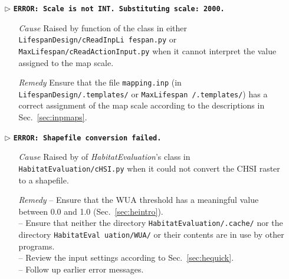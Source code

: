\begin{itemize}
	\item[$\triangleright$]\textbf{\texttt{ERROR: Scale is not INT. Substituting scale: 2000.}}
	\begin{itemize}
		\item[\textit{Cause}\hspace{0.27cm}] Raised by  function of the  class in either \texttt{LifespanDesign/cReadInpLi fespan.py} or \texttt{MaxLifespan/cReadActionInput.py} when it cannot interpret the value assigned to the map scale.
		\item[\textit{Remedy}] Ensure that the file \texttt{mapping.inp} (in \texttt{LifespanDesign/.templates/} or \texttt{MaxLifespan /.templates/}) has a correct assignment of the map scale according to the descriptions in Sec.~\ref{sec:inpmaps}.\\
	\end{itemize}
	
	\item[$\triangleright$]\textbf{\texttt{ERROR: Shapefile conversion failed.}}
	\begin{itemize}
		\item[\textit{Cause}\hspace{0.27cm}] Raised by  of \textit{HabitatEvaluation}'s  class in \texttt{HabitatEvaluation/cHSI.py} when it could not convert the CHSI raster to a shapefile.
		\item[\textit{Remedy}] -- Ensure that the WUA threshold has a meaningful value between 0.0 and 1.0 (Sec.~\ref{sec:heintro}).\\
							 -- Ensure that neither the directory \texttt{HabitatEvaluation/.cache/} nor the directory \texttt{HabitatEval uation/WUA/} or their contents are in use by other programs.\\
							 -- Review the input settings according to Sec.~\ref{sec:hequick}.\\
							 -- Follow up earlier error messages.\\
	\end{itemize}
	

\end{itemize}

